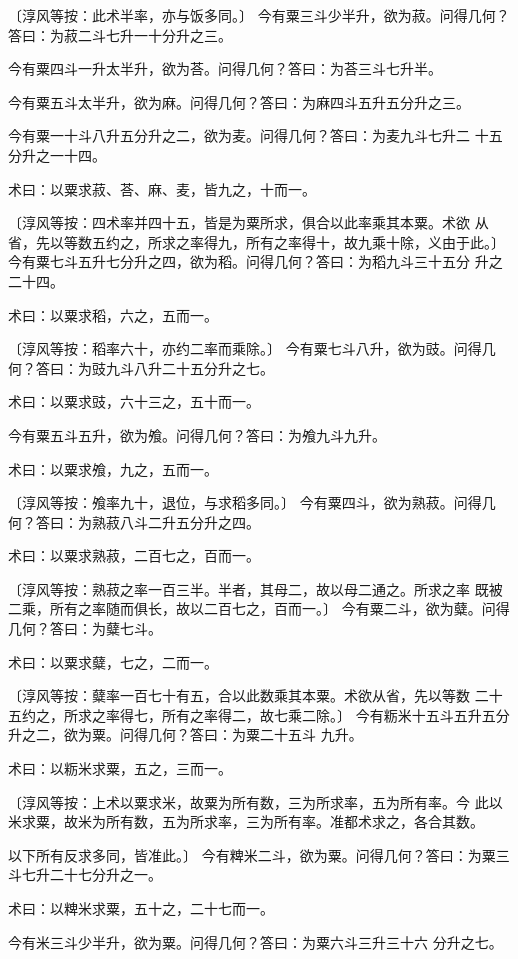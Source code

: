 \documentclass[12pt,UTF8]{ctexbook}
\begin{document}
〔淳风等按：此术半率，亦与饭多同。〕 今有粟三斗少半升，欲为菽。问得几何？答曰：为菽二斗七升一十分升之三。

今有粟四斗一升太半升，欲为荅。问得几何？答曰：为荅三斗七升半。

今有粟五斗太半升，欲为麻。问得几何？答曰：为麻四斗五升五分升之三。

今有粟一十斗八升五分升之二，欲为麦。问得几何？答曰：为麦九斗七升二 十五分升之一十四。

术曰：以粟求菽、荅、麻、麦，皆九之，十而一。

〔淳风等按：四术率并四十五，皆是为粟所求，俱合以此率乘其本粟。术欲 从省，先以等数五约之，所求之率得九，所有之率得十，故九乘十除，义由于此。〕 今有粟七斗五升七分升之四，欲为稻。问得几何？答曰：为稻九斗三十五分 升之二十四。

术曰：以粟求稻，六之，五而一。

〔淳风等按：稻率六十，亦约二率而乘除。〕 今有粟七斗八升，欲为豉。问得几何？答曰：为豉九斗八升二十五分升之七。

术曰：以粟求豉，六十三之，五十而一。

今有粟五斗五升，欲为飧。问得几何？答曰：为飧九斗九升。

术曰：以粟求飧，九之，五而一。

〔淳风等按：飧率九十，退位，与求稻多同。〕 今有粟四斗，欲为熟菽。问得几何？答曰：为熟菽八斗二升五分升之四。

术曰：以粟求熟菽，二百七之，百而一。

〔淳风等按：熟菽之率一百三半。半者，其母二，故以母二通之。所求之率 既被二乘，所有之率随而俱长，故以二百七之，百而一。〕 今有粟二斗，欲为糵。问得几何？答曰：为糵七斗。

术曰：以粟求糵，七之，二而一。

〔淳风等按：糵率一百七十有五，合以此数乘其本粟。术欲从省，先以等数 二十五约之，所求之率得七，所有之率得二，故七乘二除。〕 今有粝米十五斗五升五分升之二，欲为粟。问得几何？答曰：为粟二十五斗 九升。

术曰：以粝米求粟，五之，三而一。

〔淳风等按：上术以粟求米，故粟为所有数，三为所求率，五为所有率。今 此以米求粟，故米为所有数，五为所求率，三为所有率。准都术求之，各合其数。

以下所有反求多同，皆准此。〕 今有粺米二斗，欲为粟。问得几何？答曰：为粟三斗七升二十七分升之一。

术曰：以粺米求粟，五十之，二十七而一。

今有米三斗少半升，欲为粟。问得几何？答曰：为粟六斗三升三十六 分升之七。
\end{document}
